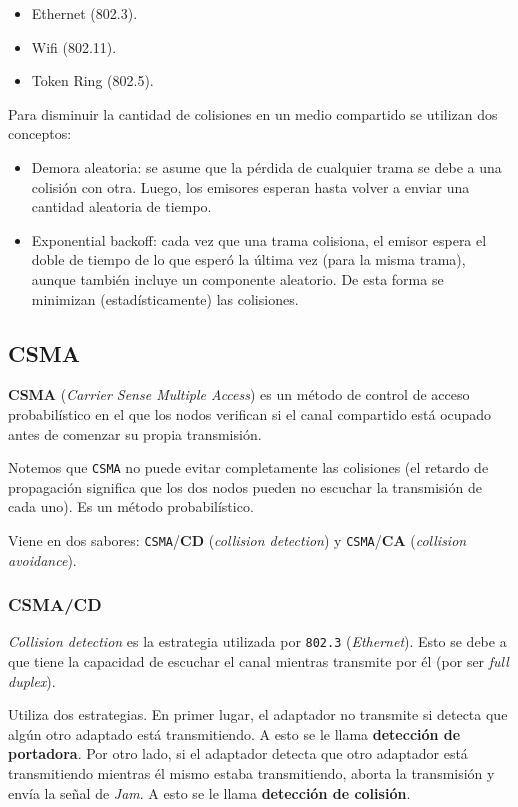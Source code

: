 \documentclass[]{article}
\begin{document}
\begin{itemize}
    \item Ethernet (802.3).
    \item Wifi (802.11).
    \item Token Ring (802.5).
\end{itemize}

Para disminuir la cantidad de colisiones en un medio compartido se utilizan dos conceptos:
\begin{itemize}
    \item Demora aleatoria: se asume que la pérdida de cualquier trama se debe a una colisión con otra. Luego, los emisores esperan hasta volver a enviar una cantidad aleatoria de tiempo.
    \item Exponential backoff: cada vez que una trama colisiona, el emisor espera el doble de tiempo de lo que esperó la última vez (para la misma trama), aunque también incluye un componente aleatorio. De esta forma se minimizan (estadísticamente) las colisiones.
\end{itemize}

\subsection{CSMA}
\textbf{CSMA} (\emph{Carrier Sense Multiple Access}) es un método de control de acceso probabilístico en el que los nodos verifican si el canal compartido está ocupado antes de comenzar su propia transmisión.

Notemos que \texttt{CSMA} no puede evitar completamente las colisiones (el retardo de propagación significa que los dos nodos pueden no escuchar la transmisión de cada uno). Es un método probabilístico.

Viene en dos sabores: \texttt{CSMA}/\textbf{CD} (\emph{collision detection}) y \texttt{CSMA}/\textbf{CA} (\emph{collision avoidance}).

\subsubsection{CSMA/CD}

\emph{Collision detection} es la estrategia utilizada por \texttt{802.3} (\emph{Ethernet}). Esto se debe a que tiene la capacidad de escuchar el canal mientras transmite por él (por ser \emph{full duplex}).

 Utiliza dos estrategias. En primer lugar, el adaptador no transmite si detecta que algún otro adaptado está transmitiendo. A esto se le llama \textbf{detección de portadora}. Por otro lado, si el adaptador detecta que otro adaptador está transmitiendo mientras él mismo estaba transmitiendo, aborta la transmisión y envía la señal de \emph{Jam}. A esto se le llama \textbf{detección de colisión}.
\end{document}
